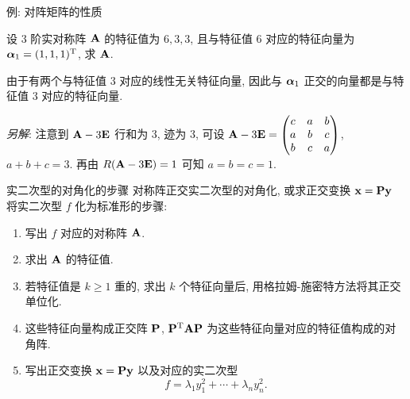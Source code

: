 \begin{frame}{例: 对阵矩阵的性质}\small
	\onslide<+->
	\begin{example}
		设 $3$ 阶实对称阵 ${\mathbf{A}}$ 的特征值为 $6,3,3$, 且与特征值 $6$ 对应的特征向量为 ${\boldsymbol{\alpha}}_1=(1,1,1)^{\mathrm{T}}$, 求 ${\mathbf{A}}$. 
	\end{example}
	\onslide<+->
	\begin{solution}
		由于有两个与特征值 $3$ 对应的线性无关特征向量, 因此与 ${\boldsymbol{\alpha}}_1$ 正交的向量都是与特征值 $3$ 对应的特征向量.
		\vspace{-.5\baselineskip}
		
		\emph{另解}:
注意到 ${\mathbf{A}}-3{\mathbf{E}}$ 行和为 $3$, 迹为 $3$, 可设 ${\mathbf{A}}-3{\mathbf{E}}=\begin{pmatrix}
			c&a&b\\
			a&b&c\\
			b&c&a
		\end{pmatrix}$, $a+b+c=3$. 再由 $R({\mathbf{A}}-3{\mathbf{E}})=1$ 可知 $a=b=c=1$.
	\end{solution}
\end{frame}


\begin{frame}{实二次型的对角化的步骤}
	\onslide<+->
	对称阵正交实二次型的对角化, 或求正交变换 ${\mathbf{x}}={\mathbf{P}}{\mathbf{y}}$ 将实二次型 $f$ 化为标准形的步骤:
	\begin{enumerate}
		\item 写出 $f$ 对应的对称阵 ${\mathbf{A}}$.
		\item 求出 ${\mathbf{A}}$ 的特征值.
		\item \alert{若特征值是 $k\ge1$ 重的, 求出 $k$ 个特征向量后, 用格拉姆-施密特方法将其正交单位化.}
		\item 这些特征向量构成正交阵 ${\mathbf{P}}$, ${\mathbf{P}}^{\mathrm{T}}{\mathbf{A}}{\mathbf{P}}$ 为这些特征向量对应的特征值构成的对角阵.
		\item 写出正交变换 ${\mathbf{x}}={\mathbf{P}}{\mathbf{y}}$ 以及对应的实二次型
		\[f=\lambda_1 y_1^2+\cdots+\lambda_n y_n^2.\]
	\end{enumerate}
\end{frame}


